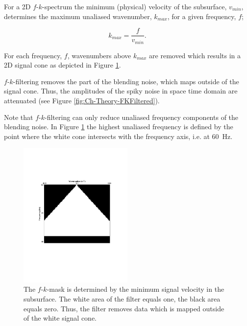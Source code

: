 For a 2D $f$-$k$-spectrum the minimum (physical) velocity of the subsurface, $v_{min}$, determines the maximum unaliased wavenumber, $k_{max}$,  for a given frequency, $f$;

\begin{equation}
	k_{max} = \frac{f}{v_{min}}.
	\label{eq_Ch-Theory-MaxWavenmber}
\end{equation} 

For each frequency, $f$, wavenumbers above $k_{max}$ are removed which results in a 2D signal cone as depicted in Figure \ref{fig:Ch-Theory-FK-Mask}.

$f$-$k$-filtering removes the part of the blending noise, which maps outside of the signal cone. Thus, the amplitudes of the spiky noise in space time domain are attenuated (see Figure \ref{fig:Ch-Theory-FKFiltered}). 

Note that $f$-$k$-filtering can only reduce unaliased frequency components of the blending noise. In Figure \ref{fig:Ch-Theory-FK-Mask} the highest unaliased frequency is defined by the point where the white cone intersects with the frequency axis, i.e. at \SI{60}{\hertz}.

\begin{figure}
	\centering
	\includegraphics[width = 0.5\textwidth]{Plots/Mahdad/5iter/FK-MaskCRG_rec30}
	\caption{The $f$-$k$-mask is determined by the minimum signal velocity in the subsurface. The white area of the filter equals one, the black area equals zero. Thus, the filter removes data which is mapped outside of the white signal cone.}
	\label{fig:Ch-Theory-FK-Mask}
\end{figure}

 

